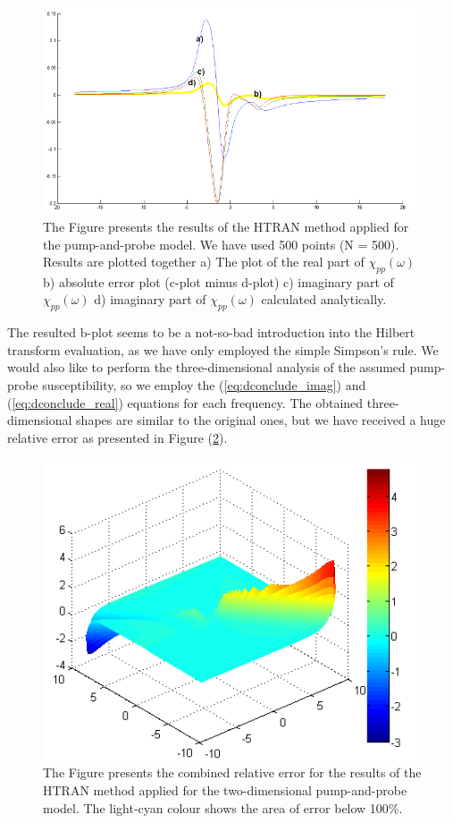 \documentclass[12pt,twoside,a4paper]{article}
\numberwithin{equation}{subsection}
\numberwithin{figure}{subsection}
\begin{document}
\begin{figure}
  \includegraphics[width=150mm]{img/htran_pnp_2d.png}
  \caption{The Figure presents the results of the HTRAN method applied for the pump-and-probe model. We have used 500 points (N =
  500). Results are plotted together 
    a) The plot of the real part of $\chi_{pp} (\omega )$ 
    b) absolute error plot (c-plot minus d-plot) 
    c) imaginary part of $\chi_{pp} (\omega )$
    d) imaginary part of ${\chi_{pp}}(\omega )$ calculated analytically.
    \label{fig:htran_pnp_2d}}
\end{figure}

The resulted b-plot seems to be a not-so-bad introduction into the Hilbert transform evaluation, as we have only employed the simple Simpson's rule. We would also like to perform the three-dimensional analysis of the assumed pump-probe susceptibility, so we employ the (\ref{eq:dconclude_imag}) and (\ref{eq:dconclude_real}) equations for each frequency. The obtained three-dimensional shapes are similar to the original ones, but we have received a huge relative error as presented in Figure (\ref{fig:htran_pnp_3derr}).

\begin{figure}
  \begin{center}
    \includegraphics{img/htran_pnp_3derr.png}
    \caption{The Figure presents the combined relative error for the results of the HTRAN method applied for the two-dimensional pump-and-probe model. The light-cyan colour shows the area of error below 100\%.  \label{fig:htran_pnp_3derr}}
  \end{center}
\end{figure} %
\end{document}
